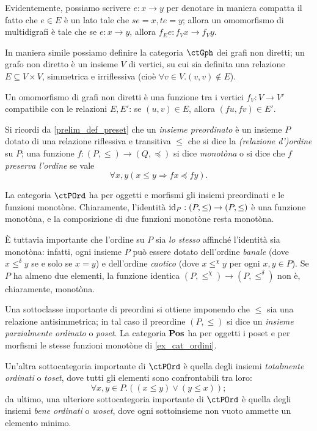 Evidentemente, possiamo scrivere \(e : x\to y\) per denotare in maniera compatta il fatto che \(e \in E\) è un lato tale che \(se=x,te=y\); allora un omomorfismo di multidigrafi è tale che se \(e : x\to y\), allora \(f_Ee : f_Vx\to f_Vy\).
\begin{example}\label{ex_cat_grafi_nondiretti}
In maniera simile possiamo definire la categoria $\ctGph$ dei grafi non diretti; un grafo non diretto è un insieme $V$ di vertici, su cui sia definita una relazione $E\subseteq V\times V$, simmetrica e irriflessiva (cioè $\forall v\in V.(v,v)\notin E$).

Un omomorfismo di grafi non diretti è una funzione tra i vertici $f_V : V\to V'$ compatibile con le relazioni $E,E'$: se $(u,v)\in E$, allora $(fu,fv)\in E'$.
\end{example}
\begin{example}\label{ex_cat_ordini}
	Si ricordi da \ref{prelim_def_preset} che un \emph{insieme preordinato} è un insieme \(P\) dotato di una relazione riflessiva e transitiva \(\le\) che si dice la \emph{(relazione d')ordine} su \(P\); una funzione \(f  : (P,\le)\to (Q,\preceq)\) si dice \emph{monotòna} o si dice che \(f\) \emph{preserva l'ordine} se vale
	\[\forall x,y(x\le y\Rightarrow fx\preceq fy).\]

	La categoria \(\ctPOrd\) ha per oggetti e morfismi gli insiemi preordinati e le funzioni monotòne. Chiaramente, l'identità \(\mathrm{id}_P : (P,\le)\to (P,\le)\) è una funzione monotòna, e la composizione di due funzioni monotòne resta monotòna.

	\`E tuttavia importante che l'ordine su \(P\) sia \emph{lo stesso} affinché l'identità sia monotòna: infatti, ogni insieme \(P\) può essere dotato dell'ordine \emph{banale} (dove \(x \mathrel{\le^\delta} y\) se e solo se \(x=y\)) e dell'ordine \emph{caotico} (dove \(x\mathrel{\le^\chi} y\) per ogni \(x,y\in P\)). Se \(P\) ha almeno due elementi, la funzione identica \((P,\le^\chi)\to (P,\le^\delta)\) non è, chiaramente, monotòna.
\end{example}
\begin{remark}[po, wo e to]\label{po_wo_to}
	Una sottoclasse importante di preordini si ottiene imponendo che \(\le\) sia una relazione antisimmetrica; in tal caso il preordine \((P,\le)\) si dice un \emph{insieme parzialmente ordinato} o \emph{poset}. La categoria \(\mathbf{Pos}\) ha per oggetti i poset e per morfismi le stesse funzioni monotòne di \ref{ex_cat_ordini}.

	Un'altra sottocategoria importante di \(\ctPOrd\) è quella degli insiemi \emph{totalmente ordinati} o \emph{toset}, dove tutti gli elementi sono confrontabili tra loro:
	\[\forall x,y\in P.((x\le y)\lor (y\le x));\]
	da ultimo, una ulteriore sottocategoria importante di \(\ctPOrd\) è quella degli insiemi \emph{bene ordinati} o \emph{woset}, dove ogni sottoinsieme non vuoto ammette un elemento minimo.
\end{remark}
